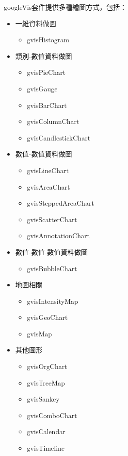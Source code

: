 \documentclass[]{book}
\providecommand{\tightlist}{%
  \setlength{\itemsep}{0pt}\setlength{\parskip}{0pt}}
\theoremstyle{definition}
\theoremstyle{definition}
\theoremstyle{remark}
\begin{document}
googleVis套件提供多種繪圖方式，包括：

\begin{itemize}
\tightlist
\item
  一維資料做圖

  \begin{itemize}
  \tightlist
  \item
    gvisHistogram
  \end{itemize}
\item
  類別-數值資料做圖

  \begin{itemize}
  \tightlist
  \item
    gvisPieChart
  \item
    gvisGauge
  \item
    gvisBarChart
  \item
    gvisColumnChart
  \item
    gvisCandlestickChart
  \end{itemize}
\item
  數值-數值資料做圖

  \begin{itemize}
  \tightlist
  \item
    gvisLineChart
  \item
    gvisAreaChart
  \item
    gvisSteppedAreaChart
  \item
    gvisScatterChart
  \item
    gvisAnnotationChart
  \end{itemize}
\item
  數值-數值-數值資料做圖

  \begin{itemize}
  \tightlist
  \item
    gvisBubbleChart
  \end{itemize}
\item
  地圖相關

  \begin{itemize}
  \tightlist
  \item
    gvisIntensityMap
  \item
    gvisGeoChart
  \item
    gvisMap
  \end{itemize}
\item
  其他圖形

  \begin{itemize}
  \tightlist
  \item
    gvisOrgChart
  \item
    gvisTreeMap
  \item
    gvisSankey
  \item
    gvisComboChart
  \item
    gvisCalendar
  \item
    gvisTimeline
  \end{itemize}
\end{itemize}
\end{document}
